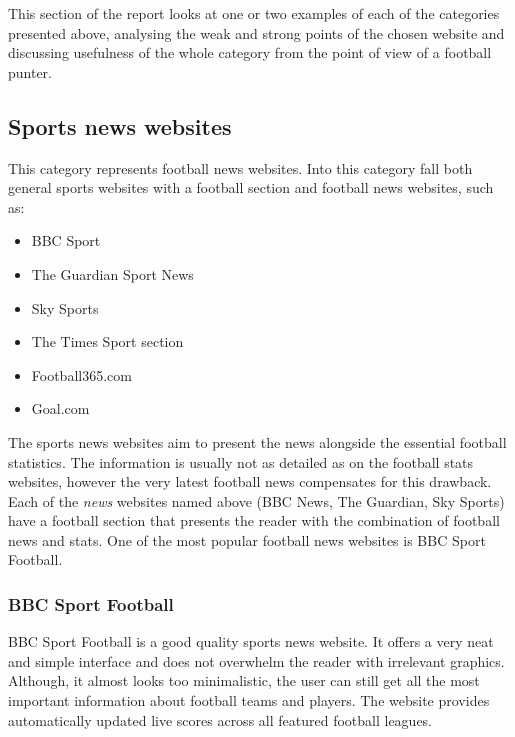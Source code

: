 This section of the report looks at one or two examples of each of the categories presented above, analysing the weak and strong points of the chosen website and discussing usefulness of the whole category from the point of view of a football punter.
	
\subsection{Sports news websites}
\label{subsec:sportsnewswebsites_req}
This category represents football news websites. Into this category fall both general sports websites with a football section and football news websites, such as:
	
\begin{itemize}
	 \item BBC Sport \citep{source:bbcsport}
	 \item The Guardian Sport News \citep{source:guardiansport}
	 \item Sky Sports \citep{source:skysports}
	 \item The Times Sport section \citep{source:thetimes}
	 \item Football365.com \citep{source:football365}
	 \item Goal.com \citep{source:goal}
\end{itemize}

The sports news websites aim to present the news alongside the essential football statistics. The information is usually not as detailed as on the football stats websites, however the very latest football news compensates for this drawback. Each of the \emph{news} websites named above (BBC News, The Guardian, Sky Sports) have a football section that presents the reader with the combination of football news and stats.  One of the most popular football news websites is BBC Sport Football.
	
\subsubsection{BBC Sport Football}
\label{subsubsec:bbcsportfootball_req}
BBC Sport Football is a good quality sports news website. It offers a very neat and simple interface and does not overwhelm the reader with irrelevant graphics. Although, it almost looks too minimalistic, the user can still get all the most important information about football teams and players. The website provides automatically updated live scores across all featured football leagues.

